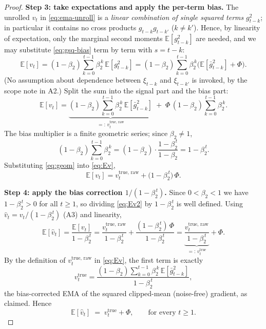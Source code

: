 \begin{proof}
\medskip
\noindent\textbf{Step 3: take expectations and apply the per-term bias.}
The unrolled $v_t$ in \eqref{eq:ema-unroll} is a \emph{linear combination of single squared
terms} $g_{t-k}^2$; in particular it contains no cross products $g_{t-k}g_{t-k'}$ ($k\ne k'$).
Hence, by linearity of expectation, only the marginal second moments $\mathbb E[g_{t-k}^2]$ are
needed, and we may substitute \eqref{eq:gsq-bias} term by term with $s=t-k$:
\[
  \mathbb E[v_t]
  = (1-\beta_2)\sum_{k=0}^{t-1}\beta_2^{\,k}\,\mathbb E[g_{t-k}^2]
  = (1-\beta_2)\sum_{k=0}^{t-1}\beta_2^{\,k}\Big(\mathbb E[\bar g_{t-k}^2]+\Phi\Big).
\]
(No assumption about dependence between $\xi_{t-k}$ and $\xi_{t-k'}$ is invoked, by the scope
note in A2.) Split the sum into the signal part and the bias part:
\begin{equation}
\label{eq:Ev}
  \mathbb E[v_t]
  = \underbrace{(1-\beta_2)\sum_{k=0}^{t-1}\beta_2^{\,k}\,\mathbb E[\bar g_{t-k}^2]}_{=:\,v_t^{\mathrm{true},\,\mathrm{raw}}}
  \;+\; \Phi\,(1-\beta_2)\sum_{k=0}^{t-1}\beta_2^{\,k}.
\end{equation}
The bias multiplier is a finite geometric series; since $\beta_2\ne 1$,
\begin{equation}
\label{eq:geom}
  (1-\beta_2)\sum_{k=0}^{t-1}\beta_2^{\,k}
  = (1-\beta_2)\cdot\frac{1-\beta_2^{\,t}}{1-\beta_2}
  = 1-\beta_2^{\,t}.
\end{equation}
Substituting \eqref{eq:geom} into \eqref{eq:Ev},
\begin{equation}
\label{eq:Ev2}
  \mathbb E[v_t]
  = v_t^{\mathrm{true},\,\mathrm{raw}} + \big(1-\beta_2^{\,t}\big)\,\Phi.
\end{equation}

\medskip
\noindent\textbf{Step 4: apply the bias correction $1/(1-\beta_2^{\,t})$.}
Since $0<\beta_2<1$ we have $1-\beta_2^{\,t}>0$ for all $t\ge1$, so dividing \eqref{eq:Ev2} by
$1-\beta_2^{\,t}$ is well defined. Using $\hat v_t = v_t/(1-\beta_2^{\,t})$ (A3) and linearity,
\[
  \mathbb E[\hat v_t]
  = \frac{\mathbb E[v_t]}{1-\beta_2^{\,t}}
  = \frac{v_t^{\mathrm{true},\,\mathrm{raw}}}{1-\beta_2^{\,t}}
    + \frac{(1-\beta_2^{\,t})\,\Phi}{1-\beta_2^{\,t}}
  = \underbrace{\frac{v_t^{\mathrm{true},\,\mathrm{raw}}}{1-\beta_2^{\,t}}}_{=:\,v_t^{\mathrm{true}}}
    + \Phi .
\]
By the definition of $v_t^{\mathrm{true},\,\mathrm{raw}}$ in \eqref{eq:Ev}, the first term is
exactly
\[
  v_t^{\mathrm{true}}
  = \frac{(1-\beta_2)\sum_{k=0}^{t-1}\beta_2^{\,k}\,\mathbb E[\bar g_{t-k}^2]}{1-\beta_2^{\,t}},
\]
the bias-corrected EMA of the squared clipped-mean (noise-free) gradient, as claimed. Hence
\[
  \mathbb E[\hat v_t] \;=\; v_t^{\mathrm{true}} + \Phi,
  \qquad\text{for every }t\ge 1.
\]


\end{proof}
